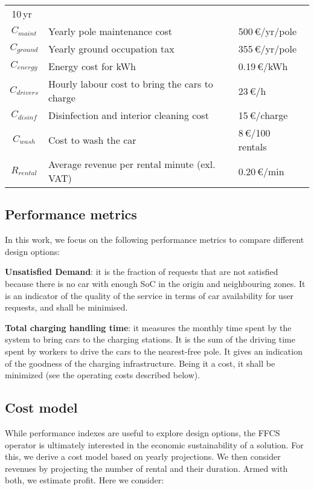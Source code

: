 \begin{table}[t]
\begin{tabular}{|c|l|l|}
        10\,yr~\cite{21_vasconcelos2017financial}\\
        $C_{maint}$ & Yearly pole maintenance cost & 500\,€/yr/pole~\cite{evInfrastructureCosts}\\
        $C_{ground}$ & Yearly ground occupation tax & 355\,€/yr/pole~\cite{cosapTurin}\\
        $C_{energy}$ & Energy cost for kWh & 0.19\,€/kWh~\cite{eurostat}\\
        $C_{drivers}$ & Hourly labour  cost to bring the cars to charge & 23\,€/h~\cite{costo_lavoro}\\
        $C_{disinf}$ & Disinfection and interior cleaning cost & 15\,€/charge~\cite{doctorCarWash}\\
        $C_{wash}$ & Cost to wash the car & 8\,€/100 rentals~\cite{doctorCarWash}\\ \hline
        $R_{rental}$ & Average revenue per rental minute (exl. VAT) & 0.20\,€/min~\cite{car2goPriceTurin}\\
\hline
    \end{tabular}
\end{table}

\subsection{Performance metrics}
In this work, we focus on the following performance metrics to compare different design options:

\textbf{Unsatisfied Demand}: it is the fraction of requests that are not satisfied because there is no car with enough SoC in the origin and neighbouring zones. It is an indicator of the quality of the service in terms of car availability for user requests, and shall be minimised.

\textbf{Total charging handling time}: it measures the monthly time spent by the system to bring cars to the charging stations.
It is the sum of the driving time spent by workers to drive the cars to the nearest-free pole. It gives an indication of the goodness of the charging infrastructure. Being it a cost, it shall be minimized (see the operating costs described below).

\subsection{Cost model}
While performance indexes are useful to explore design options, the FFCS operator is ultimately interested in the economic sustainability of a solution. For this, we derive a cost model based on yearly projections.
We then consider revenues by projecting the number of rental and their duration. Armed with both, we estimate profit.
Here we consider:


